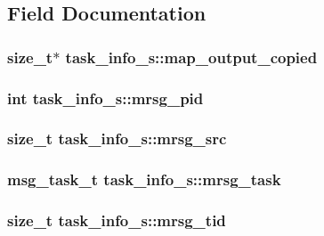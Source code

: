 \subsection{\-Field \-Documentation}
\hypertarget{structtask__info__s_a89d391613219da550d84283a89461bf4}{
\subsubsection[{map\-\_\-output\-\_\-copied}]{\setlength{\rightskip}{0pt plus 5cm}size\-\_\-t$\ast$ {\bf task\-\_\-info\-\_\-s\-::map\-\_\-output\-\_\-copied}}}\label{structtask__info__s_a89d391613219da550d84283a89461bf4}
\hypertarget{structtask__info__s_a9ec7e46e1f90db29b69480e8b9485218}{
\subsubsection[{mrsg\-\_\-pid}]{\setlength{\rightskip}{0pt plus 5cm}int {\bf task\-\_\-info\-\_\-s\-::mrsg\-\_\-pid}}}\label{structtask__info__s_a9ec7e46e1f90db29b69480e8b9485218}
\hypertarget{structtask__info__s_ad0992967bc61c85a49a410b3f9570bba}{
\subsubsection[{mrsg\-\_\-src}]{\setlength{\rightskip}{0pt plus 5cm}size\-\_\-t {\bf task\-\_\-info\-\_\-s\-::mrsg\-\_\-src}}}\label{structtask__info__s_ad0992967bc61c85a49a410b3f9570bba}
\hypertarget{structtask__info__s_aa48722944c2a15652f194ef48bd5adf3}{
\subsubsection[{mrsg\-\_\-task}]{\setlength{\rightskip}{0pt plus 5cm}msg\-\_\-task\-\_\-t {\bf task\-\_\-info\-\_\-s\-::mrsg\-\_\-task}}}\label{structtask__info__s_aa48722944c2a15652f194ef48bd5adf3}
\hypertarget{structtask__info__s_a19ae853b34711df40fa09b1eb44d2700}{
\subsubsection[{mrsg\-\_\-tid}]{\setlength{\rightskip}{0pt plus 5cm}size\-\_\-t {\bf task\-\_\-info\-\_\-s\-::mrsg\-\_\-tid}}}\label{structtask__info__s_a19ae853b34711df40fa09b1eb44d2700}
